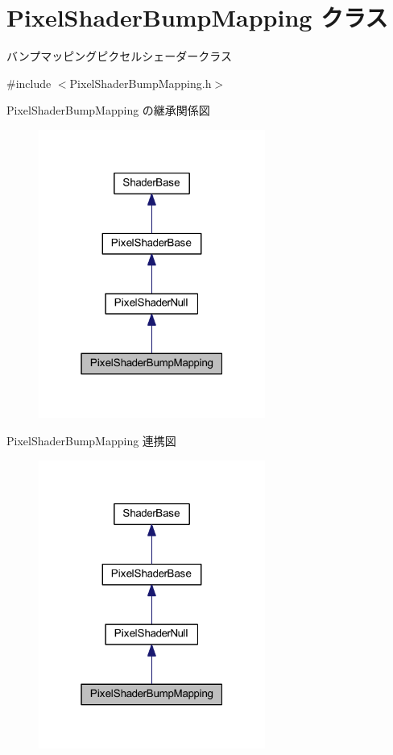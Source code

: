 \hypertarget{class_pixel_shader_bump_mapping}{}\section{Pixel\+Shader\+Bump\+Mapping クラス}
\label{class_pixel_shader_bump_mapping}


バンプマッピングピクセルシェーダークラス  




{\ttfamily \#include $<$Pixel\+Shader\+Bump\+Mapping.\+h$>$}



Pixel\+Shader\+Bump\+Mapping の継承関係図\nopagebreak
\begin{figure}[H]
\begin{center}
\leavevmode
\includegraphics[width=211pt]{class_pixel_shader_bump_mapping__inherit__graph}
\end{center}
\end{figure}


Pixel\+Shader\+Bump\+Mapping 連携図\nopagebreak
\begin{figure}[H]
\begin{center}
\leavevmode
\includegraphics[width=211pt]{class_pixel_shader_bump_mapping__coll__graph}
\end{center}
\end{figure}
